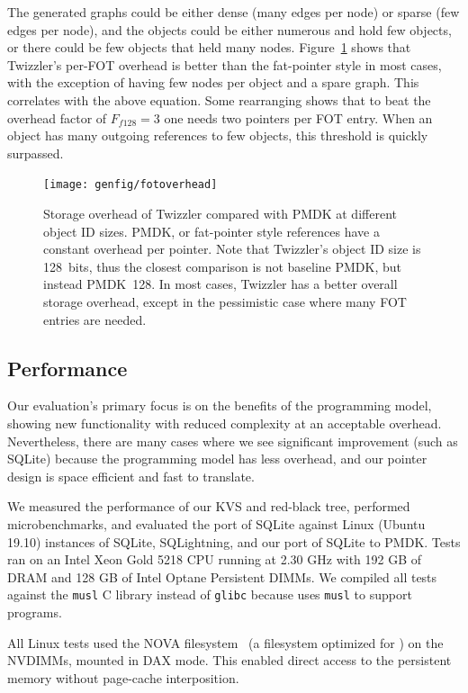 The generated graphs could be either dense (many edges per node) or sparse (few edges per node), and
the objects could be either numerous and hold few objects, or there could be few objects that held
many nodes. Figure~\ref{fig:fotoverhead} shows that Twizzler's per-FOT overhead is better than the
fat-pointer style in most cases, with the exception of having few nodes per object and a spare
graph. This  correlates with the above equation. Some  rearranging shows that to beat
the overhead factor of $F_{f128} = 3$ one needs two pointers per FOT entry. When an object has many
outgoing references to few objects, this threshold is quickly surpassed.


\begin{figure}
    \centering
    \texttt{[image: genfig/fotoverhead]}
    \caption[FOT storage overhead]{Storage overhead of Twizzler compared with PMDK at different object ID sizes. PMDK, or fat-pointer style references have a constant overhead per pointer. Note that Twizzler's object ID size is 128~bits, thus the closest comparison is not baseline PMDK, but instead PMDK~128. In most cases, Twizzler has a better overall storage overhead, except in the pessimistic case where many FOT entries are needed.}
    \label{fig:fotoverhead}
\end{figure}




\subsection{Performance}
\label{sec:res}

Our evaluation's primary focus is on the benefits of the programming model, showing new
functionality with reduced complexity at an acceptable overhead. Nevertheless, there are many
cases where we see significant improvement (such as SQLite)
because the programming model has less overhead, and our pointer design is space
efficient and fast to translate.

We measured the performance of our KVS and red-black tree, performed
microbenchmarks, and evaluated the \Twizzler port of
SQLite against Linux (Ubuntu 19.10) instances of SQLite, SQLightning, and our port of SQLite
to PMDK\@. Tests ran on an
Intel Xeon Gold 5218 CPU running at 2.30 GHz with 192 GB of DRAM and 128 GB of Intel Optane
Persistent DIMMs.
We compiled all tests against the \texttt{musl} C library instead of
\texttt{glibc} because \Twizzler uses \texttt{musl} to support \unix programs.

All Linux tests used the NOVA filesystem~\cite{Xu:nova} (a filesystem
optimized for \NVM) on the NVDIMMs, mounted in DAX mode. This enabled direct access to the
persistent memory without page-cache interposition.

